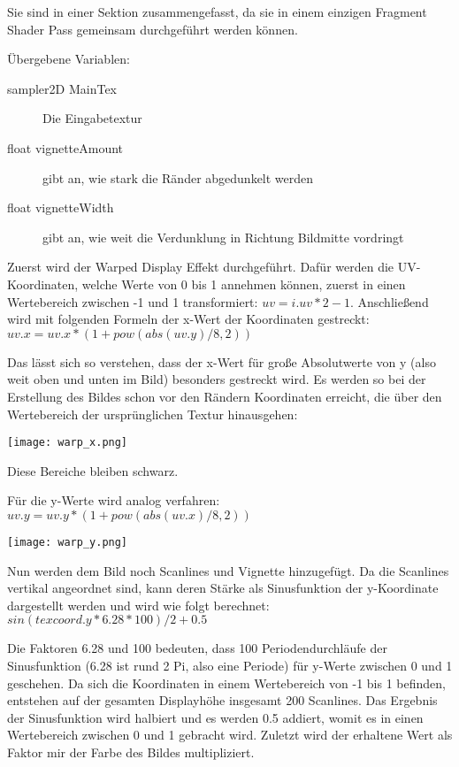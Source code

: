 Sie sind in einer Sektion zusammengefasst, da sie in einem einzigen Fragment Shader Pass gemeinsam durchgeführt werden können.

Übergebene Variablen:
\begin{description}
\item[sampler2D MainTex] Die Eingabetextur
\item[float vignetteAmount] gibt an, wie stark die Ränder abgedunkelt werden
\item[float vignetteWidth] gibt an, wie weit die Verdunklung in Richtung Bildmitte vordringt
\end{description}

Zuerst wird der Warped Display Effekt durchgeführt. Dafür werden die UV-Koordinaten, welche Werte von 0 bis 1 annehmen können, zuerst in einen Wertebereich zwischen -1 und 1 transformiert: $uv = i.uv * 2 - 1$.
Anschlie{\ss}end wird mit folgenden Formeln der x-Wert der Koordinaten gestreckt: $uv.x = uv.x * (1 + pow(abs(uv.y) / 8, 2))$

Das lässt sich so verstehen, dass der x-Wert für gro{\ss}e Absolutwerte von y (also weit oben und unten im Bild) besonders gestreckt wird. Es werden so bei der Erstellung des Bildes schon vor den Rändern Koordinaten erreicht, die über den Wertebereich der ursprünglichen Textur hinausgehen:

\texttt{[image: warp\_x.png]}

Diese Bereiche bleiben schwarz.

Für die y-Werte wird analog verfahren: $uv.y = uv.y * (1 + pow(abs(uv.x) / 8, 2))$

\texttt{[image: warp\_y.png]}

Nun werden dem Bild noch Scanlines und Vignette hinzugefügt. Da die Scanlines vertikal angeordnet sind, kann deren Stärke als Sinusfunktion der y-Koordinate dargestellt werden und wird wie folgt berechnet: $sin(texcoord.y * 6.28 * 100) / 2 + 0.5$ 

Die Faktoren 6.28 und 100 bedeuten, dass 100 Periodendurchläufe der Sinusfunktion (6.28 ist rund 2 Pi, also eine Periode) für y-Werte zwischen 0 und 1 geschehen. Da sich die Koordinaten in einem Wertebereich von -1 bis 1 befinden, entstehen auf der gesamten Displayhöhe insgesamt 200 Scanlines. Das Ergebnis der Sinusfunktion wird halbiert und es werden 0.5 addiert, womit es in einen Wertebereich zwischen 0 und 1 gebracht wird. Zuletzt wird der erhaltene Wert als Faktor mir der Farbe des Bildes multipliziert. 

